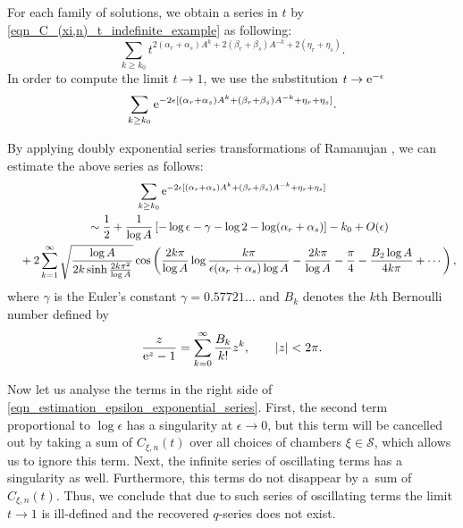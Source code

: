 \documentclass[pdftex]{sigma}
\numberwithin{equation}{section}
\begin{document}
\begin{Example}
	For each family of solutions, we obtain a series in $ t $ by \eqref{eqn_C_(xi,n)_t_indefinite_example} as following:
	\[
	\sum_{k\geq k_0} t^{2(\alpha_r+\alpha_s)A^k+2(\beta_r+\beta_s)A^{-k}+2(\eta_r+\eta_s)}.
	\]
	In order to compute the limit $ t\rightarrow 1 $, we use the substitution $ t\rightarrow {\rm e}^{-\epsilon} $
	\[
	\sum_{k\geq k_0} {\rm e}^{-2\epsilon[(\alpha_r+\alpha_s)A^k+(\beta_r+\beta_s)A^{-k}+\eta_r+\eta_s]}.
	\]
	
	By applying doubly exponential series transformations of Ramanujan \cite{ramanujan}, we can estimate the above series as follows:
	\begin{gather}
\sum_{k\geq k_0} {\rm e}^{-2\epsilon[(\alpha_r+\alpha_s)A^k+(\beta_r+\beta_s)A^{-k}+\eta_r+\eta_s]}\nonumber\\
\quad{}\sim\frac{1}{2}+\frac{1}{\log A}\left[-\log\epsilon-\gamma-\log2-\log(\alpha_r+\alpha_s)\right]-k_0+O(\epsilon)\label{eqn_estimation_epsilon_exponential_series}\\
\quad{}+2\sum_{k=1}^{\infty}\sqrt{\frac{\log A}{2k \sinh{\frac{2k\pi^2}{\log A}}}}\cos\left(\frac{2k\pi}{\log A}\log\frac{k\pi}{\epsilon(\alpha_r+\alpha_s)\log A}-\frac{2k\pi}{\log A}-\frac{\pi}{4}-\frac{B_2\log A}{4k\pi}+\cdots\right),\nonumber
		\end{gather}
	where $ \gamma $ is the Euler's constant $ \gamma=0.57721\dots $ and $ B_k $ denotes the $ k $th Bernoulli number defined by
	\[
	\frac{z}{{\rm e}^z-1}=\sum_{k=0}^{\infty}\frac{B_k}{k!}z^k, \qquad |z|<2\pi.	
	\]
	
	Now let us analyse the terms in the right side of \eqref{eqn_estimation_epsilon_exponential_series}. First, the second term proportional to $ \log \epsilon $ has a singularity at $ \epsilon\rightarrow 0 $, but this term will be cancelled out by taking a sum of $ C_{\xi,n}(t) $ over all choices of chambers $ \xi\in \mathcal{S} $, which allows us to ignore this term. Next, the infinite series of oscillating terms has a singularity as well. Furthermore, this terms do not disappear by a~sum of $ C_{\xi,n}(t) $. Thus, we conclude that due to such series of oscillating terms the limit $ t\rightarrow 1 $ is ill-defined and the recovered $ q $-series does not exist.
	
\end{Example}
\end{document}
